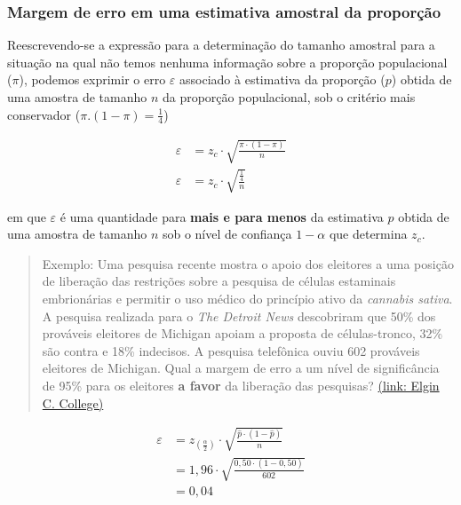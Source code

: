 \documentclass[
]{book}
\begin{document}
\hfill\break

\hypertarget{margem-de-erro-em-uma-estimativa-amostral-da-proporuxe7uxe3o}{%
\subsubsection{Margem de erro em uma estimativa amostral da proporção}\label{margem-de-erro-em-uma-estimativa-amostral-da-proporuxe7uxe3o}}

\hfill\break

Reescrevendo-se a expressão para a determinação do tamanho amostral para a situação na qual não temos nenhuma informação sobre a proporção populacional (\(\pi\)), podemos exprimir o erro \(\varepsilon\) associado à estimativa da proporção (\(p\)) obtida de uma amostra de tamanho \(n\) da proporção populacional, sob o critério mais conservador (\(\pi.(1-\pi)=\frac{1}{4}\))

\hfill\break

\begin{align*}
\varepsilon & = z_{c}\cdot \sqrt{\frac{\pi\cdot \left(1-\pi\right)}{n}} \\
\varepsilon & = z_{c}\cdot \sqrt{\frac{\frac{1}{4}}{n}}
\end{align*}

\hfill\break

em que \(\varepsilon\) é uma quantidade para \textbf{mais e para menos} da estimativa \(p\) obtida de uma amostra de tamanho \(n\) sob o nível de confiança \(1-\alpha\) que determina \(z_{c}\).

\hfill\break

\begin{quote}
Exemplo: Uma pesquisa recente mostra o apoio dos eleitores a uma posição de liberação das restrições sobre a pesquisa de células estaminais embrionárias e permitir o uso médico do princípio ativo da \textit{cannabis sativa}. A pesquisa realizada para o \textit{The Detroit News} descobriram que 50\% dos prováveis eleitores de Michigan apoiam a proposta de células-tronco, 32\% são contra e 18\% indecisos. A pesquisa telefônica ouviu 602 prováveis eleitores de Michigan. Qual a margem de erro a um nível de significância de 95\% para os eleitores \textbf{a favor} da liberação das pesquisas?
\href{https://faculty.elgin.edu/dkernler/statistics/ch09/9-1.html}{(link: Elgin C. College)}
\end{quote}

\hfill\break

\begin{align*}
\varepsilon & = {z}_{(\frac{\alpha }{2})}\cdot \sqrt{\frac{\hat{p}\cdot \left(1-\hat{p}\right)}{n}}\\
& = 1,96 \cdot \sqrt{\frac{0,50 \cdot \left(1- 0,50 \right)}{602}}\\
& = 0,04
\end{align*}
\end{document}

